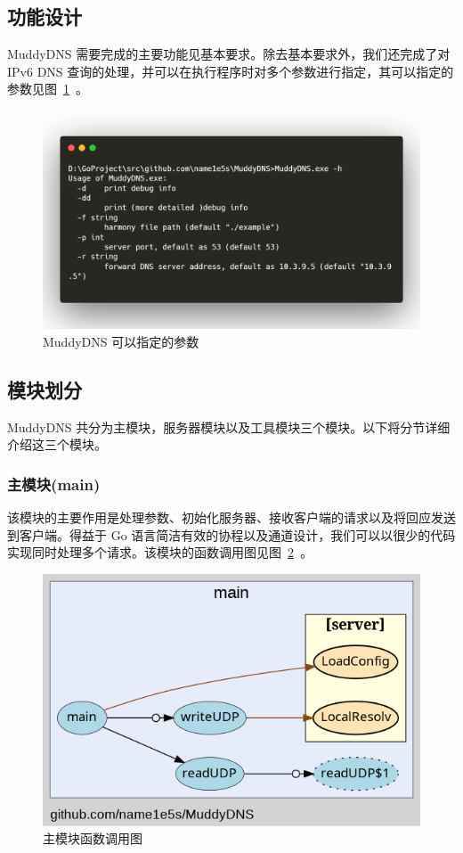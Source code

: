 \documentclass[blue,normal,cn]{elegantnote}
\begin{document}
\subsection{功能设计}
MuddyDNS 需要完成的主要功能见基本要求。除去基本要求外，我们还完成了对 IPv6 DNS 查询的处理，并可以在执行程序时对多个参数进行指定，其可以指定的参数见图~\ref{fig_help}~。
\begin{figure}[!htbp]
	\centering
	\includegraphics[width=1\textwidth]{help_screen.png}
	\caption{MuddyDNS 可以指定的参数}
	\label{fig_help}
\end{figure}
\subsection{模块划分}
MuddyDNS 共分为主模块，服务器模块以及工具模块三个模块。以下将分节详细介绍这三个模块。

\subsubsection{主模块(main)}
该模块的主要作用是处理参数、初始化服务器、接收客户端的请求以及将回应发送到客户端。得益于 Go 语言简洁有效的协程以及通道设计，我们可以以很少的代码实现同时处理多个请求。该模块的函数调用图见图~\ref{call_main}~。
\begin{figure}[!htbp]
	\centering
	\includegraphics[width=.9\textwidth]{call_main.png}
	\caption{主模块函数调用图}
	\label{call_main}
\end{figure}
\end{document}

